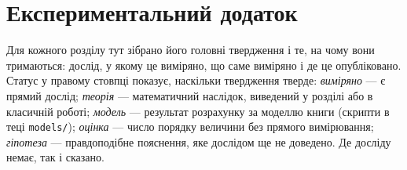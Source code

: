 \chapter{Експериментальний додаток}
\label{sec:supplement}

Для кожного розділу тут зібрано його головні твердження і те, на чому вони тримаються: дослід, у якому це виміряно, що саме виміряно і де це опубліковано. Статус у правому стовпці показує, наскільки твердження тверде: \emph{виміряно} --- є прямий дослід; \emph{теорія} --- математичний наслідок, виведений у розділі або в класичній роботі; \emph{модель} --- результат розрахунку за моделлю книги (скрипти в теці \texttt{models/}); \emph{оцінка} --- число порядку величини без прямого вимірювання; \emph{гіпотеза} --- правдоподібне пояснення, яке дослідом ще не доведено. Де досліду немає, так і сказано.























